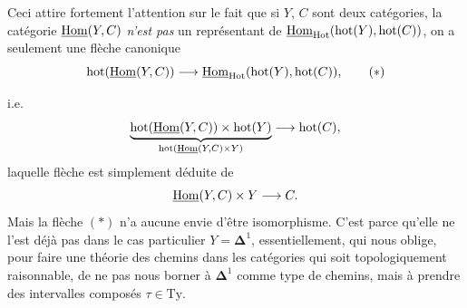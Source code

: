 Ceci attire fortement l'attention sur le fait que si $Y$, $C$ sont deux catégories, la catégorie $\underline{\mathrm{Hom}}(Y,C)$ \textit{n'est pas} un représentant de $\underline{\mathrm{Hom}}_{\mathrm{Hot}}(\mathrm{hot}(Y),\mathrm{hot}(C))$, on a seulement une flèche canonique
\[ \mathrm{hot}(\uHom(Y,C)) \longrightarrow \uHom_{\Hot}(\mathrm{hot}(Y),\mathrm{hot}(C)), \tag*{$(*)$} \]


i.e.
\[
\underbrace{\mathrm{hot}(\underline{\mathrm{Hom}}(Y,C))\times\mathrm{hot}(Y)}_{\mathrm{hot}(\underline{\mathrm{Hom}}(Y,C)\times Y)}\longrightarrow\mathrm{hot}(C),
\]
laquelle flèche est simplement déduite de
\[
\underline{\mathrm{Hom}}(Y,C)\times Y\longrightarrow C.
\]
Mais la flèche $(*)$ n'a aucune envie d'être isomorphisme. C'est parce qu'elle ne l'est déjà pas dans le cas particulier $Y=\mathbf{\Delta}^1$, essentiellement, qui nous oblige, pour faire une théorie des chemins dans les catégories qui soit topologiquement raisonnable, de ne pas nous borner à $\mathbf{\Delta}^1$ comme type de chemins, mais à prendre des intervalles composés $\tau\in\mathrm{Ty}$.

